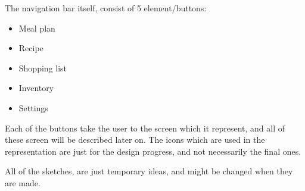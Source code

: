 The navigation bar itself, consist of 5 element/buttons:

\begin{itemize}
    \item Meal plan
    \item Recipe
    \item Shopping list
    \item Inventory
    \item Settings
\end{itemize}

Each of the buttons take the user to the screen which it represent, and all of these screen will be described later on. The icons which are used in the representation are just for the design progress, and not necessarily the final ones.

All of the sketches, are just temporary ideas, and might be changed when they are made.